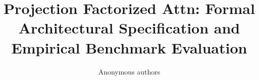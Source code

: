 \title{\textbf{Projection Factorized Attn: Formal Architectural Specification and Empirical Benchmark Evaluation}}

\author{Anonymous authors}
